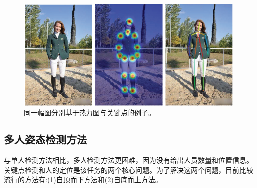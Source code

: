 \documentclass[hyperref]{ctexart}
\begin{document}
		
		\begin{figure}[H]
			\centering
			\includegraphics[scale = 0.36]{6}
			\caption{同一幅图分别基于热力图与关键点的例子。}
			\label{f}
		\end{figure}
		\begin{multicols}{2}
		\section{多人姿态检测方法}
		与单人检测方法相比，多人检测方法更困难，因为没有给出人员数量和位置信息。
		关键点检测和人的定位是该任务的两个核心问题。为了解决这两个问题，目前比较流行的方法有:(1)自顶而下方法和(2)自底而上方法。

\end{multicols}
\end{document}
